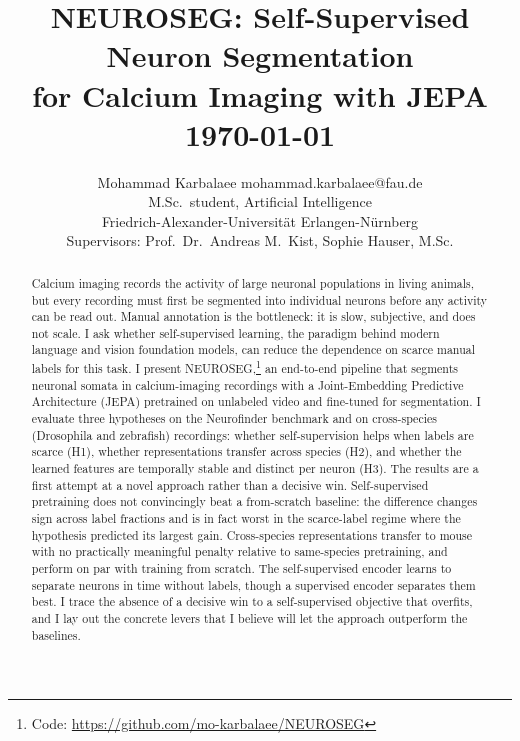 \documentclass[twoside,11pt]{article}
\begin{document}
\title{NEUROSEG: Self-Supervised Neuron Segmentation\\
for Calcium Imaging with JEPA\\[10pt]
{\normalsize\mdseries \today}}

\author{\name Mohammad Karbalaee \email mohammad.karbalaee@fau.de \\
       \addr M.Sc.\ student, Artificial Intelligence\\
       Friedrich-Alexander-Universit\"at Erlangen-N\"urnberg\\[8pt]
       Supervisors: Prof.\ Dr.\ Andreas M.\ Kist, Sophie Hauser, M.Sc.}


\vspace*{-1cm}
\maketitle
\thispagestyle{bimapfirst}

\begin{abstract}%
Calcium imaging records the activity of large neuronal populations in living animals, but every
recording must first be segmented into individual neurons before any activity can be read out.
Manual annotation is the bottleneck: it is slow, subjective, and does not scale. I ask whether
self-supervised learning, the paradigm behind modern language and vision foundation models, can
reduce the dependence on scarce manual labels for this task. I present
NEUROSEG,\footnote{Code: \url{https://github.com/mo-karbalaee/NEUROSEG}} an
end-to-end pipeline that segments neuronal somata in calcium-imaging recordings with a
Joint-Embedding Predictive Architecture (JEPA) pretrained on unlabeled video and fine-tuned for
segmentation. I evaluate three hypotheses on the Neurofinder benchmark and on
cross-species (Drosophila and zebrafish) recordings: whether self-supervision helps when labels
are scarce (H1), whether representations transfer across species (H2), and whether the learned
features are temporally stable and distinct per neuron (H3). The results are a first attempt at
a novel approach rather than a decisive win. Self-supervised pretraining does not convincingly beat
a from-scratch baseline: the difference changes sign across label fractions and is in fact worst in
the scarce-label regime where the hypothesis predicted its largest gain. Cross-species representations transfer to
mouse with no practically meaningful penalty relative to same-species pretraining, and perform on par
with training from scratch. The self-supervised encoder learns to separate neurons in time
without labels, though a supervised encoder separates them best. I trace the absence of a decisive win to a
self-supervised objective that overfits, and I lay out the concrete levers that I believe
will let the approach outperform the baselines.
\end{abstract}
\end{document}
